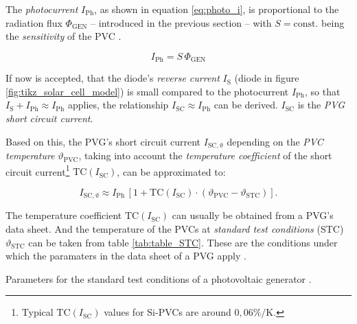 
The \emph{photocurrent} $I_{\mathrm{Ph}}$, as shown in equation \ref{eq:photo_i}, is proportional to the radiation flux $\Phi_{\mathrm{GEN}}$ -- introduced in the previous section -- with $S = \mathrm{const.}$ being the \emph{sensitivity} of the PVC \cite{Mertens:2015}.

\begin{center}
	\begin{equation} \label{eq:photo_i}
		 I_{\mathrm{Ph}} = S \, \Phi_{\mathrm{GEN}} 
	\end{equation}
\end{center}

If now is accepted, that the diode's \emph{reverse current} $I_{\mathrm{S}}$ (diode in figure \ref{fig:tikz_solar_cell_model}) is small compared to the photocurrent $I_{\mathrm{Ph}}$, so that $I_{\mathrm{S}} + I_{\mathrm{Ph}} \approx I_{\mathrm{Ph}}$ applies, the relationship $I_{\mathrm{SC}} \approx I_{\mathrm{Ph}}$ can be derived. $I_{\mathrm{SC}}$ is the \emph{PVG short circuit current}.

Based on this, the PVG's short circuit current $I_{\mathrm{SC, \vartheta}}$ depending on the \emph{PVC temperature} $\vartheta_{\mathrm{PVC}}$, taking into account the \emph{temperature coefficient} of the short circuit current\footnote{Typical $\mathrm{TC}\left(I_{\mathrm{SC}}\right)$ values for Si-PVCs are around $0,06 \% / \mathrm{K}$.} $\mathrm{TC}\left(I_{\mathrm{SC}}\right)$, can be approximated to:
\begin{center}
	\begin{equation} \label{eq:i_short_circuit}
		I_{\mathrm{SC, \vartheta}} \approx I_{\mathrm{Ph}} \, \left[ 1 + \mathrm{TC}\left(I_{\mathrm{SC}}\right) \cdot \left(\vartheta_{\mathrm{PVC}} - \vartheta_{\mathrm{STC}} \right) \right] \text{.}
	\end{equation}
\end{center}
The temperature coefficient $\mathrm{TC}\left(I_{\mathrm{SC}}\right)$ can usually be obtained from a PVG's data sheet. And the temperature of the PVCs at \emph{standard test conditions} (STC) $\vartheta_{\mathrm{STC}}$ can be taken from table \ref{tab:table_STC}. These are the conditions under which the paramaters in the data sheet of a PVG apply \cite{Mertens:2015, Wagner:2018}. 

\begin{table}[h!]
	\centering
	
	\caption{Parameters for the standard test conditions of a photovoltaic generator \cite{Mertens:2015}.}
	\label{tab:table_STC}
\end{table}

